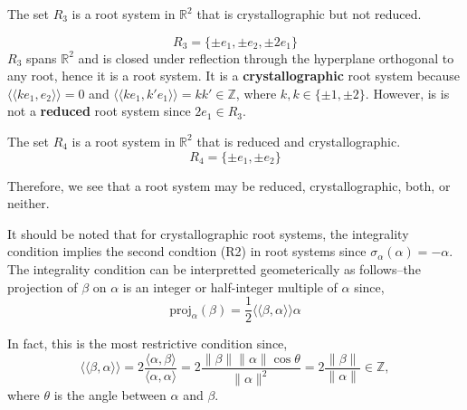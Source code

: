 \begin{example}
    The set $R_3$ is a root system in $\mathbb{R}^2$ that is crystallographic but not reduced.
    
    \begin{equation*}
        R_3 = \{
            \pm e_1, \pm e_2, \pm 2 e_1
        \} 
    \end{equation*}
    $R_3$ spans $\mathbb{R}^2$ and is closed under reflection through the hyperplane orthogonal to any root, hence it is a root system.
    It is a \textbf{crystallographic} root system because $\langle \langle k e_1, e_2 \rangle \rangle = 0$ and $\langle \langle k e_1, k' e_1 \rangle \rangle = kk' \in \mathbb{Z}$, where $k,k \in \{\pm 1, \pm 2\}$.
    However, is is not a \textbf{reduced} root system since $2 e_1 \in R_3$.
\end{example}


\begin{example}
    The set $R_4$ is a root system in $\mathbb{R}^2$ that is reduced and crystallographic.
    \begin{equation*}
        R_4 = \{
            \pm e_1, \pm e_2
            \} 
    \end{equation*}
\end{example}

Therefore, we see that a root system may be reduced, crystallographic, both, or neither. \newline

It should be noted that for crystallographic root systems, the integrality condition implies the second condtion (R2) in root systems since $\sigma_{\alpha}(\alpha) = -\alpha$.
The integrality condition can be interpretted geometerically as follows--the projection of $\beta$ on $\alpha$ is an integer or half-integer multiple of $\alpha$ since,
\begin{equation*}
    \text{proj}_{\alpha}(\beta) = \frac{1}{2} \langle \langle \beta, \alpha \rangle \rangle \alpha
\end{equation*}

In fact, this is the most restrictive condition since,
\begin{equation*}
    \langle \langle \beta, \alpha \rangle \rangle 
    =  2 \frac{ \langle \alpha, \beta \rangle}{\langle \alpha, \alpha \rangle}
    = 2 \frac{\|\beta\| \|\alpha\| \cos\theta }{\|\alpha\|^2}
    = 2 \frac{\|\beta\|}{\|\alpha\|} \in \mathbb{Z},
\end{equation*}
where $\theta$ is the angle between $\alpha$ and $\beta$.

